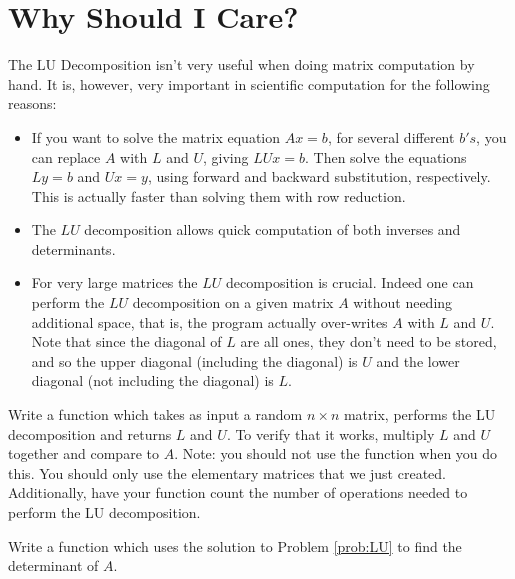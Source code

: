 \section*{Why Should I Care?}

The LU Decomposition isn't very useful when doing matrix computation
by hand.  It is, however, very important in scientific computation
for the following reasons:
\begin{itemize}
\item If you want to solve the matrix equation $A x = b$, for several different $b's$, you can replace $A$ with $L$ and $U$, giving $L U x = b$.  Then solve the equations $L y = b$ and $U x = y$, using forward and backward substitution, respectively.  This is actually faster than solving them with row reduction.
\item The $LU$ decomposition allows quick computation of both inverses and determinants.
\item For very large matrices the $LU$ decomposition is crucial.  Indeed one can perform the $LU$ decomposition on a given matrix $A$ without needing additional space, that is, the program actually over-writes $A$ with $L$ and $U$.  Note that since the diagonal of $L$ are all ones, they don't need to be stored, and so the upper diagonal (including the diagonal) is $U$ and the lower diagonal (not including the diagonal) is $L$.
\end{itemize}

\begin{problem}
\label{prob:LU}
Write a \ProgrammingLanguage function which takes as input
a random $n\times n$ matrix, performs the LU decomposition and
returns $L$ and $U$.  To verify that it works, multiply $L$ and $U$ together
and compare to $A$. Note: you should not use the  function when you do this. You should only use the elementary matrices that we just created.
Additionally, have your function count the number of operations needed to perform the LU decomposition.
\end{problem}

\begin{problem}
\label{prob:det}
Write a \ProgrammingLanguage function which uses the solution to Problem \ref{prob:LU} to find the determinant of $A$.
\end{problem}
